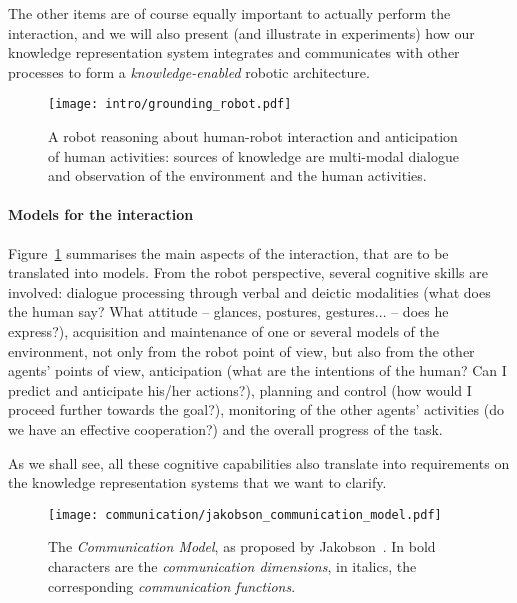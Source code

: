 The other items are of course equally important to actually perform the
interaction, and we will also present (and illustrate in experiments) how our
knowledge representation system integrates and communicates with other
processes to form a \emph{knowledge-enabled} robotic architecture.


\begin{figure}
    \centering
    \texttt{[image: intro/grounding\_robot.pdf]}
    \caption{A robot reasoning about human-robot interaction and anticipation
    of human activities: sources of knowledge are multi-modal dialogue and
    observation of the environment and the human activities.}
    \label{fig|hri-dec}
\end{figure}


\paragraph{Models for the interaction} Figure~\ref{fig|hri-dec} summarises the
main aspects of the interaction, that are to be translated into models.  From
the robot perspective, several cognitive skills are involved: dialogue
processing through verbal and deictic modalities (what does the human say? What
attitude -- glances, postures, gestures... -- does he express?), acquisition
and maintenance of one or several models of the environment, not only from the
robot point of view, but also from the other agents' points of view,
anticipation (what are the intentions of the human? Can I predict and
anticipate his/her actions?), planning and control (how would I proceed further
towards the goal?), monitoring of the other agents' activities (do we have an
effective cooperation?) and the overall progress of the task. 

As we shall see, all these cognitive capabilities also translate into
requirements on the knowledge representation systems that we want to clarify.

\begin{figure}%
\centering
  \texttt{[image: communication/jakobson\_communication\_model.pdf]}

  \caption{The \emph{Communication Model}, as proposed by
  Jakobson~\cite{Jakobson1960}. In bold characters are the \emph{communication
  dimensions}, in italics, the corresponding \emph{communication functions}.}
  
  \label{fig|jakobson_communication_model}
\end{figure}


